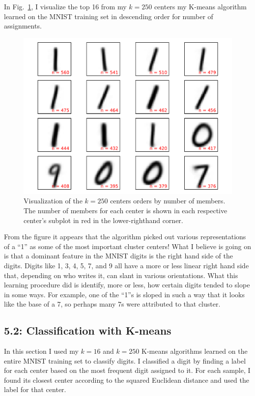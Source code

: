 \documentclass[12pt]{amsart}
\begin{document}
In Fig.~\ref{fig:k_250_means}, I visualize the top 16 from my $k = 250$ centers my K-means algorithm learned on the MNIST training set in descending order for number of assignments.

\begin{figure}[H]
	\includegraphics[width=\columnwidth]{k_250_means.pdf}
    \caption{Visualization of the $k = 250$ centers orders by number of members.  The number of members for each center is shown in each respective center's subplot in red in the lower-righthand corner.}
    \label{fig:k_250_means}
\end{figure}

From the figure it appears that the algorithm picked out various representations of a ``1'' as some of the most important cluster centers!  What I believe is going on is that a dominant feature in the MNIST digits is the right hand side of the digits.  Digits like 1, 3, 4, 5, 7, and 9 all have a more or less linear right hand side that, depending on who writes it, can slant in various orientations.  What this learning procedure did is identify, more or less, how certain digits tended to slope in some ways.  For example, one of the ``1''s is sloped in such a way that it looks like the base of a 7, so perhaps many 7s were attributed to that cluster.

\subsection*{5.2: Classification with K-means}

In this section I used my $k = 16$ and $k = 250$ K-means algorithms learned on the entire MNIST training set to classify digits.  I classified a digit by finding a label for each center based on the most frequent digit assigned to it.  For each sample, I found its closest center according to the squared Euclidean distance and used the label for that center.
\end{document}
